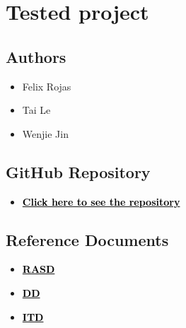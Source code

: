 \chapter{Tested project}

\section*{Authors}
\begin{itemize}
    \item Felix Rojas
    \item Tai Le
    \item Wenjie Jin
\end{itemize}

\section*{GitHub Repository}
\begin{itemize}
    \item \href{https://github.com/felixsrp/RojasJinLe}{\textcolor{black}{\textbf{Click here to see the repository}}}
\end{itemize}

\section*{Reference Documents}
\begin{itemize}
    \item \href{https://github.com/felixsrp/RojasJinLe/blob/main/DeliveryFolder/RASDv4.pdf}{\textcolor{black}{\textbf{RASD}}}
    \item \href{https://github.com/felixsrp/RojasJinLe/blob/main/DeliveryFolder/DDv3.pdf}{\textcolor{black}{\textbf{DD}}}
    \item \href{https://github.com/felixsrp/RojasJinLe/blob/main/DeliveryFolder/ITDv1.pdf}{\textcolor{black}{\textbf{ITD}}}
\end{itemize}